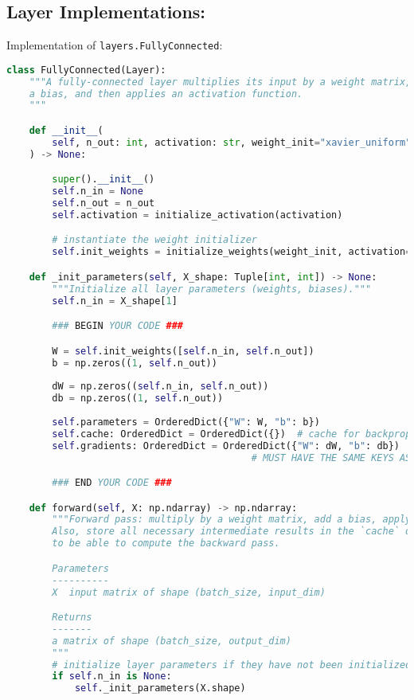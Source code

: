 \subsection{Layer Implementations:}

Implementation of \texttt{layers.FullyConnected}:

\begin{lstlisting}[language=Python]
class FullyConnected(Layer):
    """A fully-connected layer multiplies its input by a weight matrix, adds
    a bias, and then applies an activation function.
    """

    def __init__(
        self, n_out: int, activation: str, weight_init="xavier_uniform"
    ) -> None:

        super().__init__()
        self.n_in = None
        self.n_out = n_out
        self.activation = initialize_activation(activation)

        # instantiate the weight initializer
        self.init_weights = initialize_weights(weight_init, activation=activation)

    def _init_parameters(self, X_shape: Tuple[int, int]) -> None:
        """Initialize all layer parameters (weights, biases)."""
        self.n_in = X_shape[1]

        ### BEGIN YOUR CODE ###

        W = self.init_weights([self.n_in, self.n_out])
        b = np.zeros((1, self.n_out))
        
        dW = np.zeros((self.n_in, self.n_out))
        db = np.zeros((1, self.n_out))
        
        self.parameters = OrderedDict({"W": W, "b": b})
        self.cache: OrderedDict = OrderedDict({})  # cache for backprop
        self.gradients: OrderedDict = OrderedDict({"W": dW, "b": db})  # parameter gradients initialized to zero
                                           # MUST HAVE THE SAME KEYS AS `self.parameters`

        ### END YOUR CODE ###

    def forward(self, X: np.ndarray) -> np.ndarray:
        """Forward pass: multiply by a weight matrix, add a bias, apply activation.
        Also, store all necessary intermediate results in the `cache` dictionary
        to be able to compute the backward pass.

        Parameters
        ----------
        X  input matrix of shape (batch_size, input_dim)

        Returns
        -------
        a matrix of shape (batch_size, output_dim)
        """
        # initialize layer parameters if they have not been initialized
        if self.n_in is None:
            self._init_parameters(X.shape)


\end{lstlisting}
